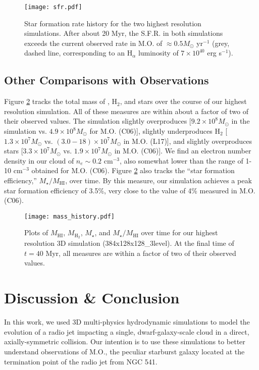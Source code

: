 \documentclass{aastex6}
\begin{document}
\begin{figure}
\texttt{[image: sfr.pdf]} 
\caption{Star formation rate history for the two highest resolution simulations. After about 20 Myr, the S.F.R. in both simulations exceeds the current observed rate in M.O. of $\approx 0.5 M_\odot$ yr$^{-1}$ (grey, dashed line, corresponding to an H$_\alpha$ luminosity of $7 \times 10^{40}$ erg s$^{-1}$).
\label{fig:sfr}}
\end{figure}

 
\subsection{Other Comparisons with Observations}

Figure \ref{fig:history} tracks the total mass of , H$_2$, and stars over the course of our highest resolution simulation. All of these measures are within about a factor of two of their observed values. The simulation slightly overproduces  [$9.2 \times 10^8 M_\odot$ in the simulation vs. $4.9 \times 10^8 M_\odot$ for M.O. (C06)], slightly underproduces H$_2$ [$1.3 \times 10^7 M_\odot$ vs. $(3.0-18) \times 10^7 M_\odot$ in M.O. (L17)], and slightly overproduces stars [$3.3 \times 10^7 M_\odot$ vs. $1.9 \times 10^7 M_\odot$ in M.O. (C06)].  We find an electron number density in our cloud of $n_e \sim 0.2$ cm$^{-3}$, also somewhat lower than the range of 1-10 cm$^{-3}$ obtained for M.O. (C06). Figure \ref{fig:history} also tracks the ``star formation efficiency,'' $M_\star/M_\mathrm{HI}$, over time.  By this measure, our simulation achieves a peak star formation efficiency of 3.5\%, very close to the value of 4\% measured in M.O. (C06). 

\begin{figure}
\texttt{[image: mass\_history.pdf]} 
\caption{Plots of $M_\mathrm{HI}$, $M_{\mathrm{H}_2}$, $M_\star$, and $M_\star/M_\mathrm{HI}$ over time for our highest resolution 3D simulation (384x128x128\_3level). At the final time of $t = 40$ Myr, all measures are within a factor of two of their observed values.
\label{fig:history}}
\end{figure}


\section{Discussion \& Conclusion} 

In this work, we used 3D multi-physics hydrodynamic simulations to model the evolution of a radio jet impacting a single, dwarf-galaxy-scale cloud in a direct, axially-symmetric collision. Our intention is to use these simulations to better understand observations of M.O., the peculiar starburst galaxy located at the termination point of the radio jet from NGC 541. 
\end{document}
